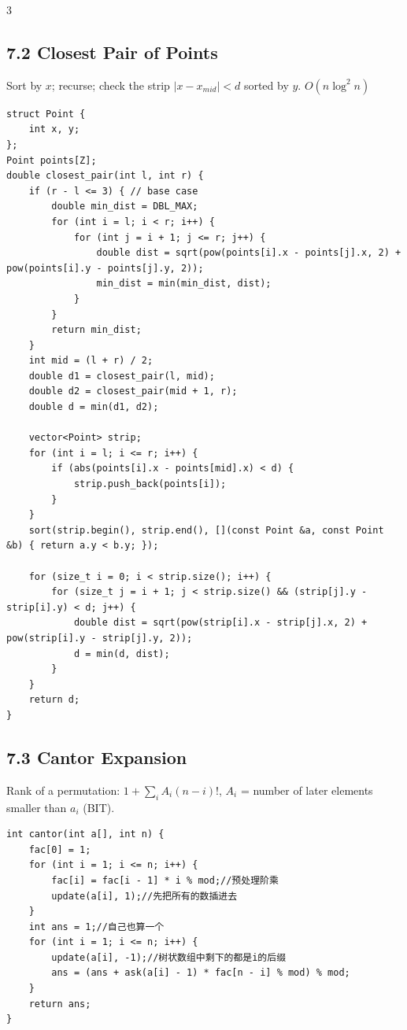 \documentclass[8pt]{extarticle}
\begin{document}
\begin{multicols*}{3}
\subsection*{7.2 Closest Pair of Points}

Sort by $x$; recurse; check the strip $|x - x_{mid}| < d$ sorted by $y$. $O(n \log^2 n)$


\begin{lstlisting}
struct Point {
    int x, y;
};
Point points[Z];
double closest_pair(int l, int r) {
    if (r - l <= 3) { // base case
        double min_dist = DBL_MAX;
        for (int i = l; i < r; i++) {
            for (int j = i + 1; j <= r; j++) {
                double dist = sqrt(pow(points[i].x - points[j].x, 2) + pow(points[i].y - points[j].y, 2));
                min_dist = min(min_dist, dist);
            }
        }
        return min_dist;
    }
    int mid = (l + r) / 2;
    double d1 = closest_pair(l, mid);
    double d2 = closest_pair(mid + 1, r);
    double d = min(d1, d2);

    vector<Point> strip;
    for (int i = l; i <= r; i++) {
        if (abs(points[i].x - points[mid].x) < d) {
            strip.push_back(points[i]);
        }
    }
    sort(strip.begin(), strip.end(), [](const Point &a, const Point &b) { return a.y < b.y; });

    for (size_t i = 0; i < strip.size(); i++) {
        for (size_t j = i + 1; j < strip.size() && (strip[j].y - strip[i].y) < d; j++) {
            double dist = sqrt(pow(strip[i].x - strip[j].x, 2) + pow(strip[i].y - strip[j].y, 2));
            d = min(d, dist);
        }
    }
    return d;
}
\end{lstlisting}

\subsection*{7.3 Cantor Expansion}

Rank of a permutation: $1 + \sum_i A_i (n - i)!$, $A_i$ = number of later elements smaller than $a_i$ (BIT).


\begin{lstlisting}
int cantor(int a[], int n) {
    fac[0] = 1;
    for (int i = 1; i <= n; i++) {
        fac[i] = fac[i - 1] * i % mod;//预处理阶乘
        update(a[i], 1);//先把所有的数插进去
    }
    int ans = 1;//自己也算一个
    for (int i = 1; i <= n; i++) {
        update(a[i], -1);//树状数组中剩下的都是i的后缀
        ans = (ans + ask(a[i] - 1) * fac[n - i] % mod) % mod;
    }
    return ans;
}
\end{lstlisting}


\end{multicols*}
\end{document}
